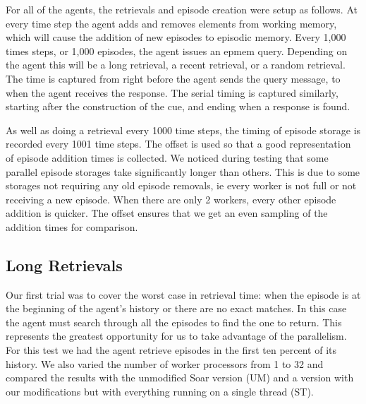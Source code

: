 \documentclass[11pt]{article} %
\begin{document}
For all of the agents, the retrievals and episode creation were setup as
follows. At every time step the agent adds and removes elements from working
memory, which will cause the addition of new episodes to episodic memory. Every
1,000 times steps, or 1,000 episodes, the agent issues an epmem query. Depending
on the agent this will be a long retrieval, a recent retrieval, or a random
retrieval. The time is captured from right before the agent sends the query
message, to when the agent receives the response. The serial timing is captured
similarly, starting after the construction of the cue, and ending when a
response is found.

As well as doing a retrieval every 1000 time steps, the timing of episode
storage is recorded every 1001 time steps. The offset is used so that a good
representation of episode addition times is collected. We noticed during testing
that some parallel episode storages take significantly longer than others. This
is due to some storages not requiring any old episode removals, ie every worker
is not full or not receiving a new episode. When there are only 2 workers, every
other episode addition is quicker. The offset ensures that we get an even
sampling of the addition times for comparison.




\subsection{Long Retrievals}
Our first trial was to cover the worst case in retrieval time: when the episode is at the beginning of 
the agent's history or there are no exact matches. In this case the agent must search through all 
the episodes to find the one to return. This represents the greatest opportunity for us to take advantage 
of the parallelism. For this test we had the agent retrieve episodes in the first ten percent of its history. 
We also varied the number of worker processors from 1 to 32 and compared the results with the unmodified 
Soar version (UM) and a version with our modifications but with everything running on a single thread (ST). 
\end{document}
